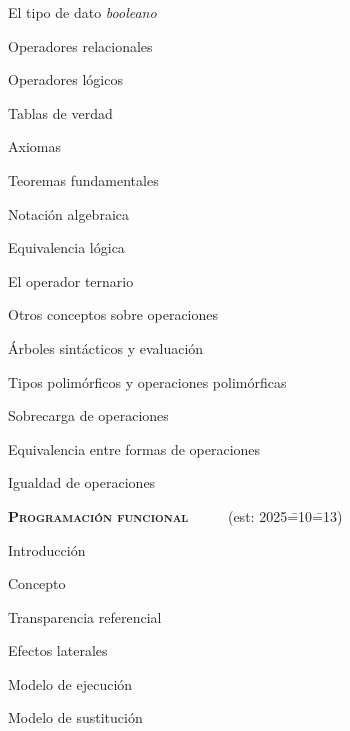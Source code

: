 \begin{longenum}
\begin{longenum}
\begin{longenum}
            \item El tipo de dato \textit{booleano}
            \item Operadores relacionales
            \item Operadores lógicos
            \begin{longenum}
                \item Tablas de verdad
            \end{longenum}
            \item Axiomas
            \item Teoremas fundamentales
            \item Notación algebraica
            \item Equivalencia lógica
            \item El operador ternario
        \end{longenum}
        \item Otros conceptos sobre operaciones
        \begin{longenum}
            \item Árboles sintácticos y evaluación
            \item Tipos polimórficos y operaciones polimórficas
            \item Sobrecarga de operaciones
            \item Equivalencia entre formas de operaciones
            \item Igualdad de operaciones
        \end{longenum}
    \end{longenum}
    \item \textbf{\textsc{Programación funcional}} \ \ \ \ \ (est: 2025\==10\==13)
    \begin{longenum}
        \item Introducción
        \begin{longenum}
            \item Concepto
            \item Transparencia referencial
            \begin{longenum}
                \item Efectos laterales
            \end{longenum}
            \item Modelo de ejecución
            \begin{longenum}
                \item Modelo de sustitución
            \end{longenum}

\end{longenum}
\end{longenum}
\end{longenum}
